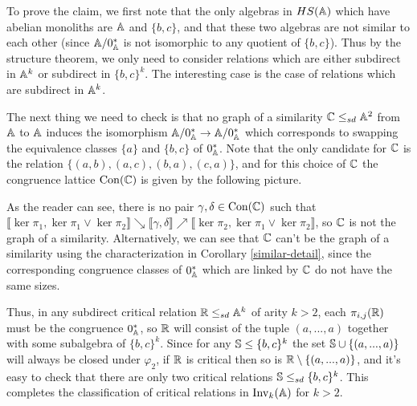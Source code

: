 \documentclass[letterpaper,11pt]{article}
\DeclareMathOperator{\Inv}{Inv}
\DeclareMathOperator{\Con}{Con}
\begin{document}
\begin{ex}
To prove the claim, we first note that the only algebras in $HS(\mathbb{A})$ which have abelian monoliths are $\mathbb{A}$ and $\{b,c\}$, and that these two algebras are not similar to each other (since $\mathbb{A}/0_{\mathbb{A}}^*$ is not isomorphic to any quotient of $\{b,c\}$). Thus by the structure theorem, we only need to consider relations which are either subdirect in $\mathbb{A}^k$ or subdirect in $\{b,c\}^k$. The interesting case is the case of relations which are subdirect in $\mathbb{A}^k$.

The next thing we need to check is that no graph of a similarity $\mathbb{C} \le_{sd} \mathbb{A}^2$ from $\mathbb{A}$ to $\mathbb{A}$ induces the isomorphism $\mathbb{A}/0_{\mathbb{A}}^* \rightarrow \mathbb{A}/0_{\mathbb{A}}^*$ which corresponds to swapping the equivalence classes $\{a\}$ and $\{b,c\}$ of $0_{\mathbb{A}}^*$. Note that the only candidate for $\mathbb{C}$ is the relation $\{(a,b),(a,c),(b,a),(c,a)\}$, and for this choice of $\mathbb{C}$ the congruence lattice $\Con(\bC)$ is given by the following picture.
\begin{center}
\end{center}
As the reader can see, there is no pair $\gamma,\delta \in \Con(\bC)$ such that $\llbracket \ker \pi_1, \ker \pi_1 \vee \ker \pi_2 \rrbracket \searrow \llbracket \gamma, \delta \rrbracket \nearrow \llbracket \ker \pi_2, \ker \pi_1 \vee \ker \pi_2 \rrbracket$, so $\mathbb{C}$ is not the graph of a similarity. Alternatively, we can see that $\mathbb{C}$ can't be the graph of a similarity using the characterization in Corollary \ref{similar-detail}, since the corresponding congruence classes of $0_{\mathbb{A}}^*$ which are linked by $\mathbb{C}$ do not have the same sizes.

Thus, in any subdirect critical relation $\mathbb{R} \le_{sd} \mathbb{A}^k$ of arity $k > 2$, each $\pi_{i,j}(\mathbb{R})$ must be the congruence $0_{\mathbb{A}}^*$, so $\mathbb{R}$ will consist of the tuple $(a,...,a)$ together with some subalgebra of $\{b,c\}^k$. Since for any $\mathbb{S} \le \{b,c\}^k$ the set $\mathbb{S} \cup \{(a,...,a)\}$ will always be closed under $\varphi_2$, if $\mathbb{R}$ is critical then so is $\mathbb{R} \setminus \{(a,...,a)\}$, and it's easy to check that there are only two critical relations $\mathbb{S} \le_{sd} \{b,c\}^k$. This completes the classification of critical relations in $\Inv_k(\bA)$ for $k > 2$.
\end{ex}
\end{document}
